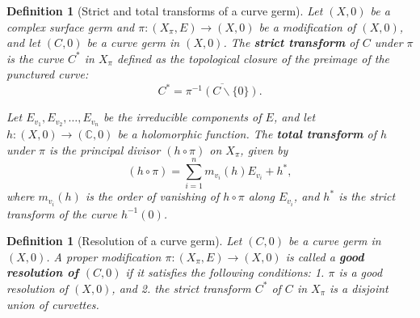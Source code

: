 \documentclass[reqno,dvipsnames,12pt]{amsart}
\renewcommand{\setminus}{\smallsetminus}
\newtheorem{prop}[thm]{Proposition}
\newtheorem{defi}[thm]{Definition}
\begin{document}
\begin{defi}[Strict and total transforms of a curve germ]
Let $(X,0)$ be a complex surface germ and $\pi : (X_\pi, E) \to (X,0)$ be a modification of $(X,0)$, and let $(C,0)$ be a curve germ in $(X,0)$. The \textbf{strict transform} of $C$ under $\pi$ is the curve $C^*$ in $X_\pi$ defined as the topological closure of the preimage of the punctured curve:
\[
C^* = \overline{\pi^{-1}(C \setminus \{0\})}.
\]

Let $E_{v_1}, E_{v_2}, \dots, E_{v_n}$ be the irreducible components of $E$, and let $h:(X,0) \to (\mathbb{C},0)$ be a holomorphic function. The \textbf{total transform} of $h$ under $\pi$ is the principal divisor $(h \circ \pi)$ on $X_\pi$, given by
\[
(h \circ \pi) = \sum_{i=1}^n m_{v_i}(h) E_{v_i} + h^*,
\]
where $m_{v_i}(h)$ is the order of vanishing of $h \circ \pi$ along $E_{v_i}$, and $h^*$ is the strict transform of the curve $h^{-1}(0)$.
\end{defi}




\begin{defi}[Resolution of a curve germ]
Let $(C,0)$ be a curve germ in $(X,0)$. A proper modification
$\pi : (X_\pi, E) \to (X,0)$
is called a \textbf{good resolution of $(C,0)$} if it satisfies the following conditions:  
1. $\pi$ is a good resolution of $(X,0)$, and  
2. the strict transform $C^*$ of $C$ in $X_\pi$ is a disjoint union of curvettes.
\end{defi}
\end{document}
